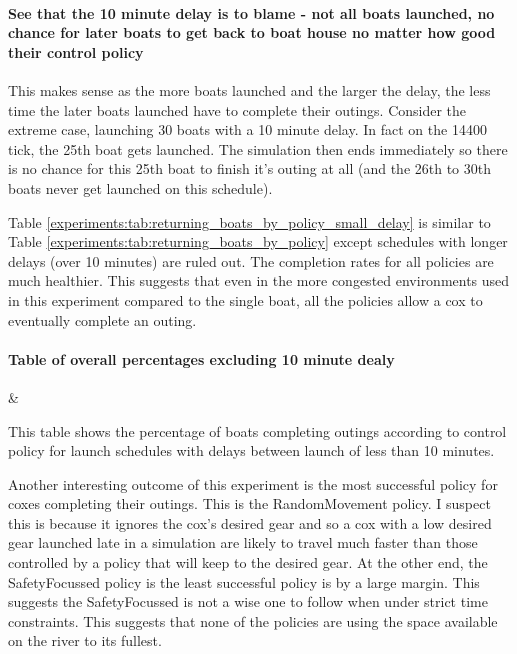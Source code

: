   \paragraph{See that the 10 minute delay is to blame - not all boats launched, no chance for later boats to get back to boat house no matter how good their control policy}
  This makes sense as the more boats launched and the larger the delay, the less time the later boats launched have to complete their outings. Consider the extreme case, launching 30 boats with a 10 minute delay. In fact on the 14400 tick, the 25th boat gets launched. The simulation then ends immediately so there is no chance for this 25th boat to finish it's outing at all (and the 26th to 30th boats never get launched on this schedule). 
  
  Table \ref{experiments:tab:returning_boats_by_policy_small_delay} is similar to Table \ref{experiments:tab:returning_boats_by_policy} except schedules with longer delays (over 10 minutes) are ruled out. The completion rates for all policies are much healthier. This suggests that even in the more congested environments used in this experiment compared to the single boat, all the policies allow a cox to eventually complete an outing. 
  
  \paragraph{Table of overall percentages excluding 10 minute dealy}
  \begin{table}[h]
  \centering
  {\cp & \landed}
  \caption{This table shows the percentage of boats completing outings according to control policy for launch schedules with delays between launch of less than 10 minutes.}
  \label{experiments:tab:returning_boats_by_policy_small_delay}
  \end{table}
  
  Another interesting outcome of this experiment is the most successful policy for coxes completing their outings. This is the RandomMovement policy. I suspect this is because it ignores the cox's desired gear and so a cox with a low desired gear launched late in a simulation are likely to travel much faster than those controlled by a policy that will keep to the desired gear. At the other end, the SafetyFocussed policy is the least successful policy is by a large margin. This suggests the SafetyFocussed is not a wise one to follow when under strict time constraints. This suggests that none of the policies are using the space available on the river to its fullest.
  
